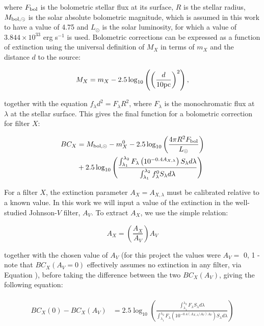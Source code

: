 \documentclass[12pt, a4paper]{report}
\begin{document}
where  $F_{\textnormal{bol}}$ is the bolometric stellar flux at its surface, $R$ is the stellar radius, $M_{\textnormal{bol},\odot}$ is the solar absolute bolometric magnitude, which is assumed in this work to have a value of 4.75 and $L_{\odot}$ is the solar luminosity, for which a value of $3.844 \times 10^{33}$ erg s$^{-1}$ is used. Bolometric corrections can be expressed as a function of extinction using the universal definition of $M_{X}$ in terms of $m_{X}$ and the distance $d$ to the source:

\begin{equation}
M_{X} = m_{X} - 2.5 \log_{10}\left( \left( \frac{d}{10 \textnormal{pc}} \right)^{2} \right),
\label{abs_mag_def}
\end{equation}

together with the equation $f_{\lambda}d^{2}=F_{\lambda}R^{2}$, where $F_{\lambda}$ is the monochromatic flux at $\lambda$ at the stellar surface. This gives the final function for a bolometric correction for filter $X$:

\begin{align}
\begin{split}
BC_{X} &= M_{\textnormal{bol},\odot} - m_{X}^{0} - 2.5 \log_{10} \left( \frac{4\pi R^{2}F_{\textnormal{bol}}}{L_{\odot}} \right) \\
&+ 2.5 \log_{10} \left( \frac{\int_{\lambda_{1}}^{\lambda_{2}} F_{\lambda} \left( 10^{-0.4 A_{X,\lambda}} \right) S_{\lambda} d\lambda}{\int_{\lambda_{1}}^{\lambda_{2}} f_{\lambda}^{0} S_{\lambda} d\lambda} \right)
\label{BC_extinc}
\end{split}
\end{align}

For a filter $X$, the extinction parameter $A_{X} = A_{X,\lambda}$ must be calibrated relative to a known value. In this work we will input a value of the extinction in the well-studied Johnson-$V$ filter, $A_{V}$. To extract $A_{X}$, we use the simple relation:

\begin{equation}
A_{X} = \left( \frac{A_{X}}{A_{V}} \right) A_{V}
\label{ratio_eq}
\end{equation}

together with the chosen value of $A_{V}$ (for this project the values were $A_{V} =$ 0, 1 - note that $BC_{X}(A_{V}=0)$ effectively assumes no extinction in any filter, via Equation ), before taking the difference between the two $BC_{X}(A_{V})$, giving the following equation:

\begin{align}
\begin{split}
BC_{X}(0) - BC_{X}(A_{V}) &= 2.5 \log_{10} \left( \frac{\int_{\lambda_{1}}^{\lambda_{2}} F_{\lambda}  S_{\lambda} d\lambda}{\int_{\lambda_{1}}^{\lambda_{2}} F_{\lambda}\left( 10^{-0.4 \left(A_{X,\lambda}/A_{V}\right)A_{V}} \right) S_{\lambda} d\lambda} \right)
\label{BCs_diff}
\end{split}
\end{align}
\end{document}
